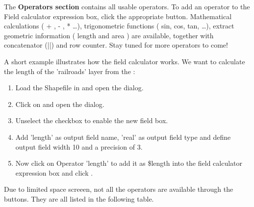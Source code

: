 The \textbf{Operators section} contains all usable operators. To add an operator
to the Field calculator expression box, click the appropriate button. Mathematical
calculations ( + , - , * \dots), trigonometric functions ( sin, cos, tan, \dots),
extract geometric information ( length and area ) are available, together with
concatenator (||) and row counter. Stay tuned for more operators to come!

A short example illustrates how the field calculator works. We want to calculate
the length of the 'railroads' layer from the :

\begin{enumerate}
\item Load the Shapefile  in \qg and open
the  dialog.
\item Click on  and
open the  dialog.
\item Unselect the  checkbox to enable the
new field box.
\item Add 'length' as output field name, 'real' as output field type and define
output field width 10 and a precision of 3.
\item Now click on Operator 'length' to add it as \$length into the
field calculator expression box and click .
\end{enumerate}

Due to limited space screeen, not all the operators are available through the buttons. They are all listed in the following table.

